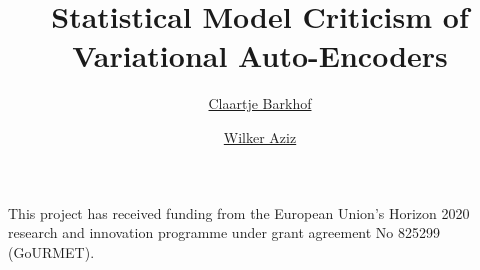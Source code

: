 \documentclass[accepted]{uai2022} %
\title{Statistical Model Criticism of Variational Auto-Encoders}
\author[1]{\href{mailto:<cbarkhof@gmail.com>?Subject=Statistical Model Criticism of Variational Auto-Encoders}{Claartje Barkhof}{}}
\author[1]{\href{mailto:<w.aziz@uva.nl>?Statistical Model Criticism of Variational Auto-Encoders}{Wilker Aziz}{}}
\affil[1]{%
    Institute for Logic, Language and Computation\\
    University of Amsterdam
}
\begin{document}
\maketitle

\begin{abstract}
  
\end{abstract}





% 


\clearpage  %






\begin{acknowledgements} %
    This project has received funding from the European Union's Horizon 2020 research and innovation programme under grant agreement No 825299  (GoURMET).
    
\end{acknowledgements}
\end{document}
